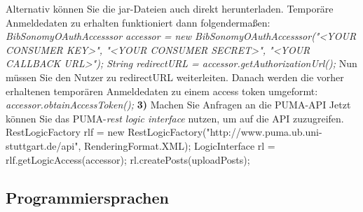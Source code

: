   
Alternativ können Sie die jar-Dateien auch direkt herunterladen.\newline
Temporäre Anmeldedaten zu erhalten funktioniert dann folgendermaßen:\newline
\newline
\textit{BibSonomyOAuthAccesssor accessor = new BibSonomyOAuthAccesssor("<YOUR CONSUMER KEY>", "<YOUR CONSUMER SECRET>", "<YOUR CALLBACK URL>");\newline
String redirectURL = accessor.getAuthorizationUrl();}
\newline
\newline 
Nun müssen Sie den Nutzer zu redirectURL weiterleiten. Danach werden die vorher erhaltenen temporären Anmeldedaten zu einem access token umgeformt:\newline
\newline
\textit{accessor.obtainAccessToken();}
\newline
\newline
\textbf{3)} Machen Sie Anfragen an die PUMA-API\newline
Jetzt können Sie das PUMA-\textit{rest logic interface} nutzen, um auf die API zuzugreifen.
\newline
\newline
RestLogicFactory rlf = new RestLogicFactory("http://www.puma.ub.uni-stuttgart.de/api", RenderingFormat.XML);\newline
LogicInterface rl = rlf.getLogicAccess(accessor);\newline
[...]\newline
rl.createPosts(uploadPosts);\newline
[...]\newline




\subsection{Programmiersprachen}
